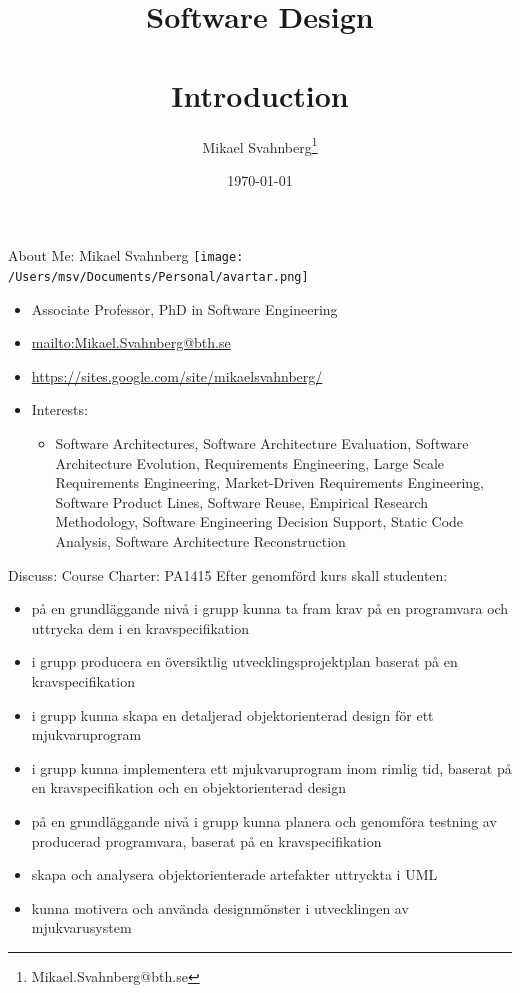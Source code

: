 \documentclass[10pt,t,a4paper]{beamer}
\author{Mikael Svahnberg\thanks{Mikael.Svahnberg@bth.se}}
\date{\today}
\title{Software Design\\\\Introduction}
\begin{document}
\maketitle

\begin{frame}[label=sec-1]{About Me: Mikael Svahnberg}
\texttt{[image: /Users/msv/Documents/Personal/avartar.png]}
\begin{itemize}
\item Associate Professor, PhD in Software Engineering
\item \url{mailto:Mikael.Svahnberg@bth.se}
\item \url{https://sites.google.com/site/mikaelsvahnberg/}
\item Interests:
\begin{itemize}
\item Software Architectures, Software Architecture Evaluation, Software Architecture Evolution, Requirements Engineering, Large Scale Requirements Engineering, Market-Driven Requirements Engineering, Software Product Lines, Software Reuse, Empirical Research Methodology, Software Engineering Decision Support, Static Code Analysis, Software Architecture Reconstruction
\end{itemize}
\end{itemize}
\end{frame}
\begin{frame}[label=sec-2]{Discuss: Course Charter: PA1415}
Efter genomförd kurs skall studenten:
\begin{itemize}
\item på en grundläggande nivå i grupp kunna ta fram krav på en programvara och uttrycka dem i en kravspecifikation
\item i grupp producera en översiktlig utvecklingsprojektplan baserat på en kravspecifikation
\item i grupp kunna skapa en detaljerad objektorienterad design för ett mjukvaruprogram
\item i grupp kunna implementera ett mjukvaruprogram inom rimlig tid, baserat på en kravspecifikation och en objektorienterad design
\item på en grundläggande nivå i grupp kunna planera och genomföra testning av producerad programvara, baserat på en kravspecifikation
\item skapa och analysera objektorienterade artefakter uttryckta i UML
\item kunna motivera och använda designmönster i utvecklingen av mjukvarusystem
\end{itemize}
\end{frame}
\end{document}
